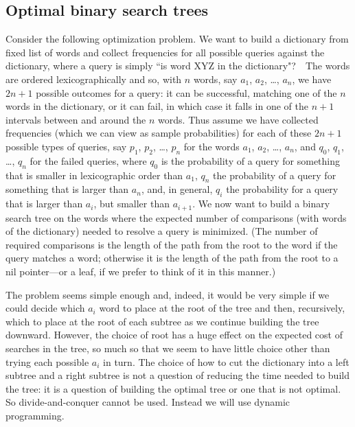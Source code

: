 \documentclass[11pt]{article}
\begin{document}
\subsection{Optimal binary search trees}
Consider the following optimization problem.  We want to build a dictionary
from fixed list of words and collect frequencies for all possible queries
against the dictionary, where a query is simply ``is word XYZ in the
dictionary"?\ \ The words are ordered lexicographically and so, with $n$
words, say $a_1$, $a_2$, \dots, $a_n$, we have $2n+1$ possible outcomes
for a query: it can be successful, matching one of the $n$ words
in the dictionary, or it can fail, in which case it falls in one of the $n+1$
intervals between and around the $n$ words. Thus assume we have collected
frequencies (which we can view as sample probabilities) for each of these
$2n+1$ possible types of queries, say $p_1$, $p_2$, \dots, $p_n$ for the
words $a_1$, $a_2$, \dots, $a_n$, and $q_0$, $q_1$, \dots, $q_n$ for the
failed queries, where $q_0$ is the probability of a query for something
that is smaller in lexicographic order than $a_1$, $q_n$ the probability
of a query for something that is larger than $a_n$, and, in general,
$q_i$ the probability for a query that is larger than $a_i$, but smaller
than $a_{i+1}$.  We now want to build a binary search tree on the words
where the expected number of comparisons (with words of the dictionary)
needed to resolve a query is minimized.   (The number of required
comparisons is the length of the path from the root to the word if the
query matches a word; otherwise it is the length of the path from the root
to a nil pointer---or a leaf, if we prefer to think of it in this manner.)

The problem seems simple enough and, indeed, it would be very simple if we
could decide which $a_i$ word to place at the root of the tree and then,
recursively, which to place at the root of each subtree as we continue
building the tree downward.  However, the choice of root has a huge
effect on the expected cost of searches in the tree, so much so that we
seem to have little choice other than trying each possible $a_i$ in turn.
The choice of how to cut the dictionary into a left subtree and a right
subtree is not a question of reducing the time needed to build the tree:
it is a question of building the optimal tree or one that is not optimal.
So divide-and-conquer cannot be used.  Instead we will use dynamic programming.
\end{document}
